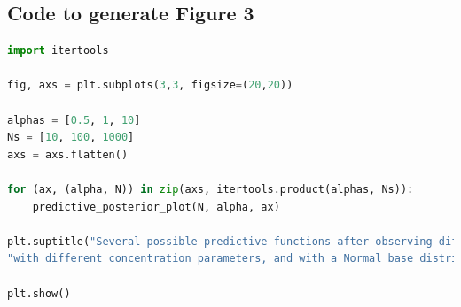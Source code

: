 \documentclass[11pt]{article}
\begin{document}
\subsection{Code to generate Figure 3}
\begin{lstlisting}[language=Python]
import itertools

fig, axs = plt.subplots(3,3, figsize=(20,20))

alphas = [0.5, 1, 10]
Ns = [10, 100, 1000]
axs = axs.flatten()

for (ax, (alpha, N)) in zip(axs, itertools.product(alphas, Ns)):
	predictive_posterior_plot(N, alpha, ax)

plt.suptitle("Several possible predictive functions after observing different numbers of samples,\n"+
"with different concentration parameters, and with a Normal base distribution", fontsize=22)

plt.show()
\end{lstlisting}
\end{document}
